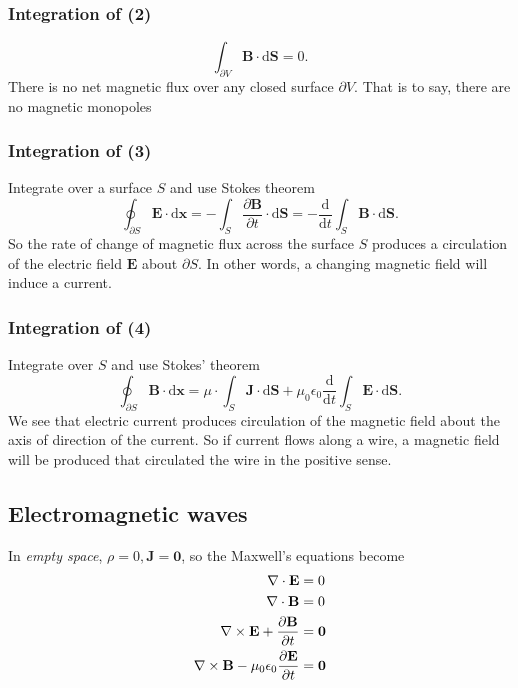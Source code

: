 \subsubsection*{Integration of (2)}
\[
    \int_{\partial V} \mathbf{B} \cdot\mathrm{d}\mathbf{S} = 0.
\]
There is no net magnetic flux over any closed surface $ \partial V $. That is to say, there are no magnetic monopoles
\subsubsection*{Integration of (3)}
Integrate over a surface $S$ and use Stokes theorem
\[
    \oint_{\partial S} \mathbf{E}\cdot\mathrm{d}\mathbf{x} = - \int_{S} \frac{\partial \mathbf{B}}{\partial t}  \cdot\mathrm{d}\mathbf{S} = -\frac{\mathrm{d}}{\mathrm{d}t} \int_{S} \mathbf{B} \cdot\mathrm{d}\mathbf{S} .
\]
So the rate of change of magnetic flux across the surface $S$ produces a circulation of the electric field $\mathbf{E}$ about $\partial S$. In other words, a changing magnetic field will induce a current.

\subsubsection*{Integration of (4)}
Integrate over $S$ and use Stokes' theorem 
\[
    \oint_{\partial S} \mathbf{B} \cdot\mathrm{d}\mathbf{x} = \mu \cdot \int_{S} \mathbf{J} \cdot\mathrm{d}\mathbf{S} + \mu_0 \epsilon_0 \frac{\mathrm{d}}{\mathrm{d}t}\int_{S} \mathbf{E} \cdot\mathrm{d}\mathbf{S} .
\]
We see that electric current produces circulation of the magnetic field about the axis of direction of the current. So if current flows along a wire, a magnetic field will be produced that circulated the wire in the positive sense.

\subsection{Electromagnetic waves}
In \textit{empty space}, $ \rho=0,\mathbf{J}=\mathbf{0} $, so the Maxwell's equations become
\begin{align*}
    \nabla\cdot \mathbf{E} &= 0\\ 
    \nabla\cdot\mathbf{B}&= 0\\ 
    \nabla\times\mathbf{E}+\frac{\partial \mathbf{B}}{\partial t}&=\mathbf{0} \\ 
    \nabla\times\mathbf{B}-\mu_0 \epsilon_0 \frac{\partial \mathbf{E}}{\partial t}&=\mathbf{0}
\end{align*}

